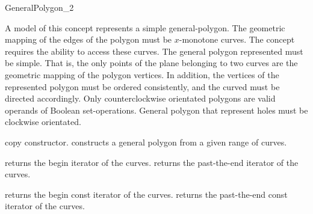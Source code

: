 \ccRefPageBegin

\begin{ccRefConcept}{GeneralPolygon_2}

\ccTypes


\ccGlue
{}

\ccDefinition
A model of this concept represents a simple general-polygon. The
geometric mapping of the edges of the polygon must be $x$-monotone curves.
The concept requires the ability to access these curves. 
The general polygon represented must be simple. That is, the
only points of the plane belonging to two curves are the geometric mapping
of the polygon vertices. In addition, the vertices of the represented 
polygon must be ordered consistently, and the curved must be directed 
accordingly. Only counterclockwise orientated polygons are valid operands
of Boolean set-operations. General polygon that represent holes must be
clockwise orientated.

\ccCreation
{}

\ccThreeToTwo

\ccGlue
{}
{copy constructor.}
\ccGlue
{}
\ccGlue
{}
{constructs a general polygon from a given range of curves.}

\ccAccessFunctions

{returns the begin iterator of the curves.}
\ccGlue
{} 
{returns the past-the-end iterator of the curves.}

{returns the begin const iterator of the curves.}
\ccGlue
{} 
{returns the past-the-end const iterator of the curves.}


\end{ccRefConcept}
